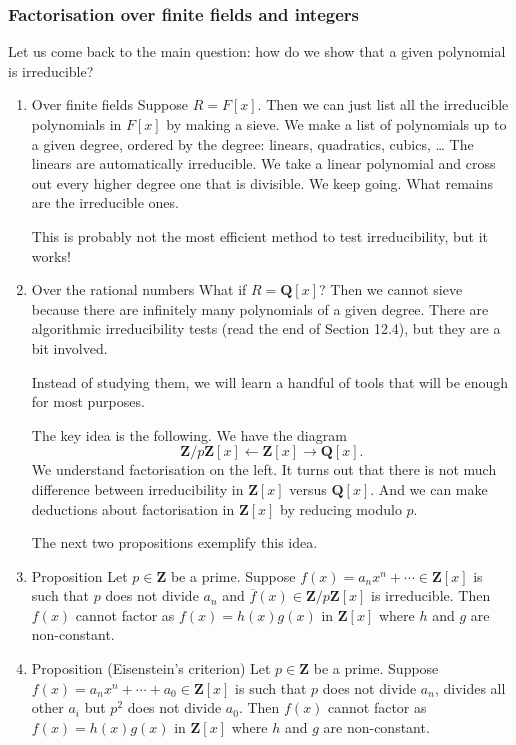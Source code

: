\documentclass[11pt]{article}
\begin{document}
\subsubsection{Factorisation over finite fields and integers}
\label{sec:org257c49e}
Let us come back to the main question: how do we show that a given polynomial is irreducible?  
\begin{enumerate}
\item Over finite fields
\label{sec:org600e81b}
Suppose \(R = F[x]\).
Then we can just list all the irreducible polynomials in \(F[x]\) by making a sieve.
We make a list of polynomials up to a given degree, ordered by the degree: linears, quadratics, cubics, \ldots{}
The linears are automatically irreducible.
We take a linear polynomial and cross out every higher degree one that is divisible.
We keep going.
What remains are the irreducible ones.

This is probably not the most efficient method to test irreducibility, but it works!
\item Over the rational numbers
\label{sec:org1bb3477}
What if \(R = \mathbf{Q}[x]\)?
Then we cannot sieve because there are infinitely many polynomials of a given degree.
There are algorithmic irreducibility tests (read the end of Section 12.4), but they are a bit involved.

Instead of studying them, we will learn a handful of tools that will be enough for most purposes.

The key idea is the following.
We have the diagram
\[ \mathbf{Z}/p \mathbf{Z} [x] \leftarrow \mathbf{Z}[x] \rightarrow \mathbf{Q}[x].\]
We understand factorisation on the left.
It turns out that there is not much difference between irreducibility in \(\mathbf{Z}[x]\) versus \(\mathbf{Q}[x]\).
And we can make deductions about factorisation in \(\mathbf{Z}[x]\) by reducing modulo \(p\).

The next two propositions exemplify this idea.
\item Proposition
\label{sec:org713fee8}
Let \(p \in \mathbf{Z}\) be a prime.
Suppose \(f(x) = a_{n} x^n + \cdots \in \mathbf{Z}[x]\) is such that \(p\) does not divide \(a_{n}\) and \(\overline f(x) \in \mathbf{Z}/p \mathbf{Z} [x]\) is irreducible.
Then \(f(x)\) cannot factor as \(f(x) = h(x) g(x)\) in \(\mathbf{Z}[x]\) where \(h\) and \(g\) are non-constant.
\item Proposition (Eisenstein's criterion)
\label{sec:org59794b9}
Let \(p \in \mathbf{Z}\) be a prime.
Suppose \(f(x) = a_{n} x^n + \cdots + a_{0} \in \mathbf{Z}[x]\) is such that \(p\) does not divide \(a_{n}\), divides all other \(a_i\) but \(p^2\) does not divide \(a_{0}\).
Then \(f(x)\) cannot factor as \(f(x) = h(x) g(x)\) in \(\mathbf{Z}[x]\) where \(h\) and \(g\) are non-constant.
\end{enumerate}
\end{document}
